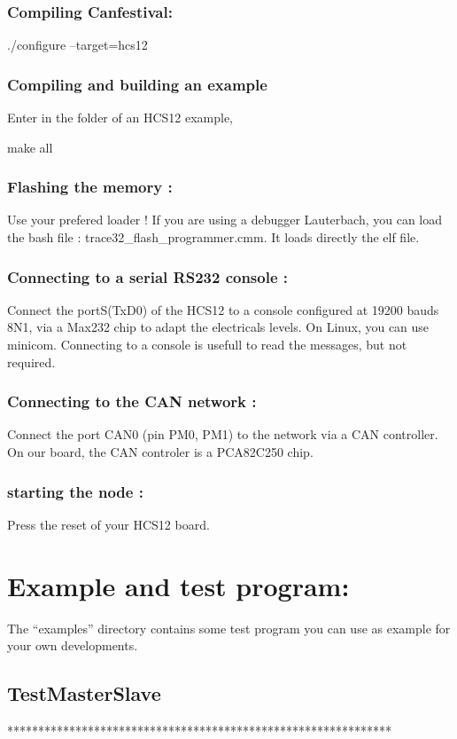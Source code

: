 \documentclass[a4paper,12pt]{book}
\begin{document}
\subsubsection{Compiling Canfestival:}
{\ttfamily
./configure {--}target=hcs12}

\subsubsection{Compiling and building an example}
Enter in the folder of an HCS12 example, 

{\ttfamily
make all}

\subsubsection{Flashing the memory :}
Use your prefered loader ! If you are using a debugger Lauterbach, you
can load the bash file : trace32\_flash\_programmer.cmm. It loads
directly the elf file.

\subsubsection{Connecting to a serial RS232 console :}
Connect the portS(TxD0) of the HCS12 to a console configured at 19200
bauds 8N1, via a Max232 chip to adapt the electricals levels. On Linux,
you can use minicom. Connecting to a console is usefull to read the
messages, but not required.

\subsubsection{Connecting to the CAN network :}
Connect the port CAN0 (pin PM0, PM1) to the network via a CAN
controller. On our board, the CAN controler is a PCA82C250 chip.

\subsubsection{starting the node :}
Press the reset of your HCS12 board.

\section{Example and test program:}
The ``examples'' directory contains some test program you can use as
example for your own developments.

\subsection{TestMasterSlave}
{\ttfamily
**************************************************************\space}
\end{document}

